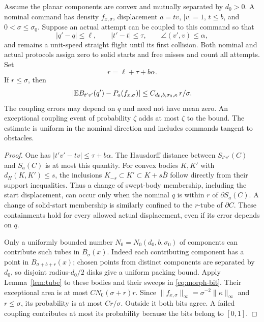 \begin{theorem}\label{thm:calibration}
Assume the planar components are convex and mutually separated by
$d_0>0$. A nominal command has density $f_{x,\sigma}$, displacement
$a=tv$, $|v|=1$, $t\le b$, and $0<\sigma\le\sigma_0$.
Suppose an actual attempt can be coupled to this command so that
\[
 |q'-q|\le\ell,\qquad |t'-t|\le\tau,\qquad
 \angle(v',v)\le\alpha,
\]
and remains a unit-speed straight flight until its first collision.
Both nominal and actual protocols assign zero to solid starts and free
misses and count all attempts. Set
\begin{equation}\label{eq:calibration-size}
             r=\ell+\tau+b\alpha.
\end{equation}
If $r\le\sigma$, then
\begin{equation}\label{eq:calibration-bias}
 \left|\mathbb E B_{t'v'}(q')-P_a(f_{x,\sigma})\right|
                  \le C_{d_0,b,\sigma_0,\kappa}\,r/\sigma.
\end{equation}
The coupling errors may depend on $q$ and need not have mean zero.
An exceptional coupling event of probability $\zeta$ adds at most
$\zeta$ to the bound. The estimate is uniform in the nominal direction
and includes commands tangent to obstacles.
\end{theorem}
\begin{proof}
One has $|t'v'-tv|\le\tau+b\alpha$. The Hausdorff distance between
$S_{t'v'}(C)$ and $S_a(C)$ is at most this quantity. For convex bodies
$K,K'$ with $d_H(K,K')\le s$, the inclusions
$K_{-s}\subset K'\subset K+s\overline B$ follow directly from their
support inequalities. Thus a change of swept-body membership, including
the start displacement, can occur only when the nominal $q$ is within
$r$ of $\partial S_a(C)$. A change of solid-start membership is similarly
confined to the $r$-tube of $\partial C$. These containments hold for
every allowed actual displacement, even if its error depends on $q$.

Only a uniformly bounded number $N_0=N_0(d_0,b,\sigma_0)$ of components
can contribute such tubes in $B_\sigma(x)$. Indeed each contributing
component has a point in $B_{\sigma+b+r}(x)$; chosen points from distinct
components are separated by $d_0$, so disjoint radius-$d_0/2$ disks give
a uniform packing bound. Apply Lemma~\ref{lem:tube} to these bodies
and their sweeps in \eqref{eq:morph-bit}. Their exceptional area is at
most $C N_0(\sigma+r)r$. Since
$\|f_{x,\sigma}\|_\infty=\sigma^{-2}\|\kappa\|_\infty$ and
$r\le\sigma$, its probability is at most $Cr/\sigma$. Outside it
both bits agree. A failed coupling contributes at most its probability
because the bits belong to $[0,1]$.
\end{proof}

